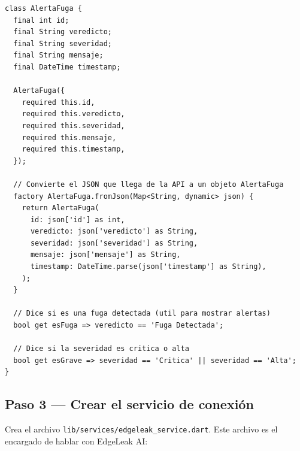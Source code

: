 \documentclass[12pt, a4paper]{article}
\begin{document}
\begin{lstlisting}[style=dartStyle, caption={lib/models/alerta\_fuga.dart}]
class AlertaFuga {
  final int id;
  final String veredicto;
  final String severidad;
  final String mensaje;
  final DateTime timestamp;

  AlertaFuga({
    required this.id,
    required this.veredicto,
    required this.severidad,
    required this.mensaje,
    required this.timestamp,
  });

  // Convierte el JSON que llega de la API a un objeto AlertaFuga
  factory AlertaFuga.fromJson(Map<String, dynamic> json) {
    return AlertaFuga(
      id: json['id'] as int,
      veredicto: json['veredicto'] as String,
      severidad: json['severidad'] as String,
      mensaje: json['mensaje'] as String,
      timestamp: DateTime.parse(json['timestamp'] as String),
    );
  }

  // Dice si es una fuga detectada (util para mostrar alertas)
  bool get esFuga => veredicto == 'Fuga Detectada';

  // Dice si la severidad es critica o alta
  bool get esGrave => severidad == 'Critica' || severidad == 'Alta';
}
\end{lstlisting}

\subsection{Paso 3 — Crear el servicio de conexión}

Crea el archivo \texttt{lib/services/edgeleak\_service.dart}. Este archivo
es el encargado de hablar con EdgeLeak AI:
\end{document}
